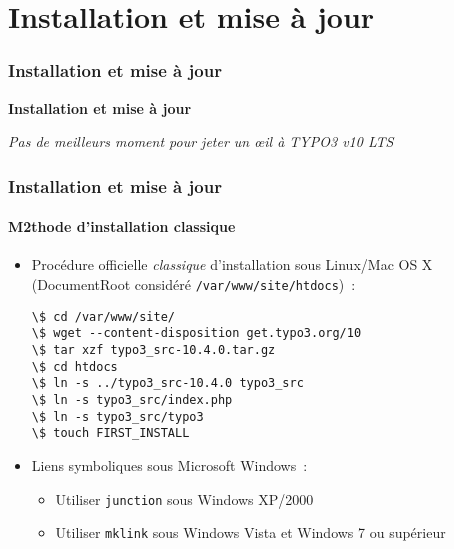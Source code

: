 %

\section{Installation et mise à jour}
\begin{frame}[fragile]
	\frametitle{Installation et mise à jour}

	\begin{center}\huge{\color{typo3darkgrey}\textbf{Installation et mise à jour}}\end{center}
	\begin{center}\large{\textit{Pas de meilleurs moment pour jeter un œil à TYPO3 v10 LTS}}\end{center}

\end{frame}


\begin{frame}[fragile]
	\frametitle{Installation et mise à jour}
	\framesubtitle{M2thode d'installation classique}

	\begin{itemize}
		\item Procédure officielle \textit{classique} d'installation sous Linux/Mac OS X\newline
			(DocumentRoot considéré \texttt{/var/www/site/htdocs})~:
\begin{lstlisting}
\$ cd /var/www/site/
\$ wget --content-disposition get.typo3.org/10
\$ tar xzf typo3_src-10.4.0.tar.gz
\$ cd htdocs
\$ ln -s ../typo3_src-10.4.0 typo3_src
\$ ln -s typo3_src/index.php
\$ ln -s typo3_src/typo3
\$ touch FIRST_INSTALL
\end{lstlisting}

		\item  Liens symboliques sous Microsoft Windows~:

			\begin{itemize}
				\item Utiliser \texttt{junction} sous Windows XP/2000
				\item Utiliser \texttt{mklink} sous Windows Vista et Windows 7 ou supérieur
			\end{itemize}

	\end{itemize}
\end{frame}

